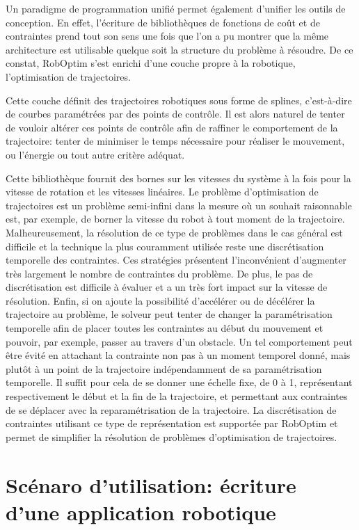 Un paradigme de programmation unifié permet également d'unifier les
outils de conception. En effet, l'écriture de bibliothèques de
fonctions de coût et de contraintes prend tout son sens une fois que
l'on a pu montrer que la même architecture est utilisable quelque soit
la structure du problème à résoudre. De ce constat, RobOptim s'est
enrichi d'une couche propre à la robotique, l'optimisation de
trajectoires.

Cette couche définit des trajectoires robotiques sous forme de
splines, c'est-à-dire de courbes
paramétrées par des points de
contrôle. Il est alors naturel de tenter de
vouloir altérer ces points de contrôle afin de raffiner le comportement
de la trajectoire: tenter de minimiser le temps nécessaire pour
réaliser le mouvement, ou l'énergie ou tout autre critère adéquat.

Cette bibliothèque fournit des bornes sur les vitesses du système à la
fois pour la vitesse de rotation et les vitesses linéaires. Le
problème d'optimisation de trajectoires est un problème semi-infini
dans la mesure où un souhait raisonnable est, par exemple, de borner
la vitesse du robot à tout moment de la trajectoire. Malheureusement,
la résolution de ce type de problèmes dans le cas général est
difficile et la technique la plus couramment utilisée reste une
discrétisation temporelle des contraintes. Ces stratégies présentent
l'inconvénient d'augmenter très largement le nombre de contraintes du
problème. De plus, le pas de discrétisation est difficile à évaluer et
a un très fort impact sur la vitesse de résolution. Enfin, si on
ajoute la possibilité d'accélérer ou de décélérer la trajectoire au
problème, le solveur peut tenter de changer la paramétrisation
temporelle afin de placer toutes les contraintes au début du mouvement
et pouvoir, par exemple, passer au travers d'un obstacle. Un tel
comportement peut être évité en attachant la contrainte non pas à un
moment temporel donné, mais plutôt à un point de la trajectoire
indépendamment de sa paramétrisation temporelle. Il suffit pour cela
de se donner une échelle fixe, de 0 à 1, représentant respectivement
le début et la fin de la trajectoire, et permettant aux contraintes de
se déplacer avec la reparamétrisation de la trajectoire. La
discrétisation de contraintes utilisant ce type de représentation est
supportée par RobOptim et permet de simplifier la résolution de
problèmes d'optimisation de trajectoires.


\section[Scénaro d'utilisation]{Scénaro d'utilisation: écriture d'une application robotique}
\label{sec:chap1_roboptim_scenario}


